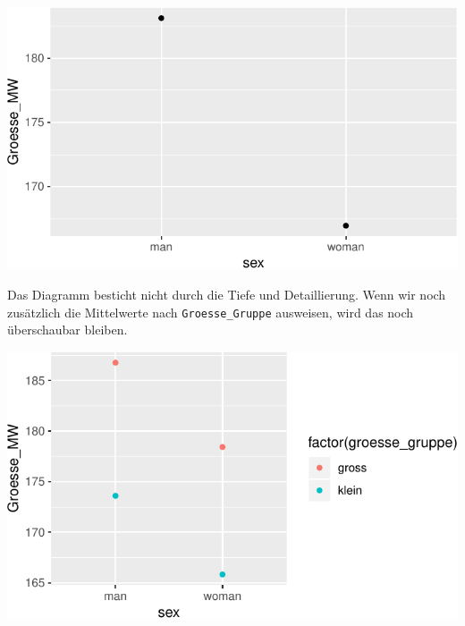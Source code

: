 \documentclass[12pt,ngerman,paper=a4,pagesize,DIV=13]{scrreprt}
\newenvironment{Shaded}{\begin{snugshade}}{\end{snugshade}}
\newcommand{\DataTypeTok}[1]{\textcolor[rgb]{0.13,0.29,0.53}{#1}}
\newcommand{\KeywordTok}[1]{\textcolor[rgb]{0.13,0.29,0.53}{\textbf{#1}}}
\newcommand{\NormalTok}[1]{#1}
\newcommand{\OperatorTok}[1]{\textcolor[rgb]{0.81,0.36,0.00}{\textbf{#1}}}
\newcommand{\StringTok}[1]{\textcolor[rgb]{0.31,0.60,0.02}{#1}}
\begin{document}
\includegraphics{DatenerhebungStatistik-Uebung_files/figure-latex/unnamed-chunk-256-1.pdf}

Das Diagramm besticht nicht durch die Tiefe und Detaillierung. Wenn wir
noch zusätzlich die Mittelwerte nach \texttt{Groesse\_Gruppe} ausweisen,
wird das noch überschaubar bleiben.

\begin{Shaded}
\end{Shaded}

\includegraphics{DatenerhebungStatistik-Uebung_files/figure-latex/unnamed-chunk-257-1.pdf}
\end{document}
